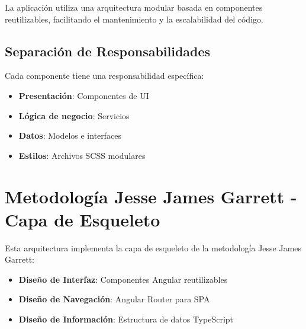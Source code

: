 La aplicación utiliza una arquitectura modular basada en componentes reutilizables, facilitando el mantenimiento y la escalabilidad del código.

\subsection{Separación de Responsabilidades}

Cada componente tiene una responsabilidad específica:
\begin{itemize}
    \item \textbf{Presentación}: Componentes de UI
    \item \textbf{Lógica de negocio}: Servicios
    \item \textbf{Datos}: Modelos e interfaces
    \item \textbf{Estilos}: Archivos SCSS modulares
\end{itemize}

\section{Metodología Jesse James Garrett - Capa de Esqueleto}

Esta arquitectura implementa la capa de esqueleto de la metodología Jesse James Garrett:

\begin{itemize}
    \item \textbf{Diseño de Interfaz}: Componentes Angular reutilizables
    \item \textbf{Diseño de Navegación}: Angular Router para SPA
    \item \textbf{Diseño de Información}: Estructura de datos TypeScript
\end{itemize}
